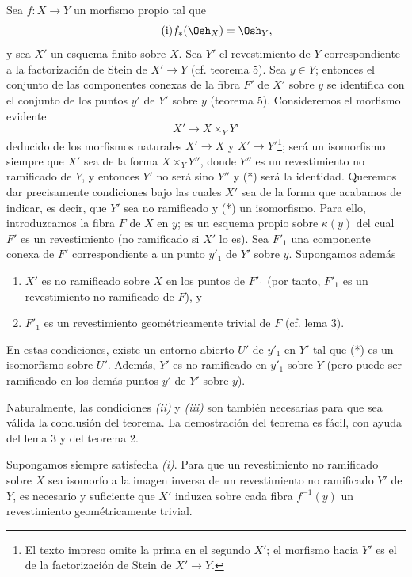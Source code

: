 Sea $f:X\longrightarrow Y$ un morfismo propio tal que
\begin{equation}
  \tag{i}
  f_*(\Osh_X)=\Osh_Y,
\end{equation}
y sea $X'$ un esquema finito sobre $X$. Sea $Y'$ el revestimiento de $Y$
correspondiente a la factorización de Stein de $X'\longrightarrow Y$
(cf. teorema 5). Sea $y\in Y$; entonces el conjunto de las componentes conexas
de la fibra $F'$ de $X'$ sobre $y$ se identifica con el conjunto de los puntos
$y'$ de $Y'$ sobre $y$ (teorema 5). Consideremos el morfismo evidente
\begin{equation}
  \tag{*}
  X'\longrightarrow X\times_Y Y'
\end{equation}
deducido de los morfismos naturales $X'\longrightarrow X$ y
$X'\longrightarrow Y'$\footnote{El texto impreso omite la prima en el segundo
$X'$; el morfismo hacia $Y'$ es el de la factorización de Stein de
$X'\to Y$.}; será un isomorfismo siempre que $X'$ sea de la forma
$X\times_Y Y''$, donde $Y''$ es un revestimiento no ramificado de $Y$, y
entonces $Y'$ no será sino $Y''$ y (*) será la identidad. Queremos dar
precisamente condiciones bajo las cuales $X'$ sea de la forma que acabamos de
indicar, es decir, que $Y'$ sea no ramificado y (*) un isomorfismo. Para ello,
introduzcamos la fibra $F$ de $X$ en $y$; es un esquema propio sobre
$\kappa(y)$ del cual $F'$ es un revestimiento (no ramificado si $X'$ lo es).
Sea $F'_1$ una componente conexa de $F'$ correspondiente a un punto $y'_1$ de
$Y'$ sobre $y$. Supongamos además
\begin{enumerate}
  \item[\textit{(ii)}] $X'$ es no ramificado sobre $X$ en los puntos de $F'_1$
    (por tanto, $F'_1$ es un revestimiento no ramificado de $F$), y
  \item[\textit{(iii)}] $F'_1$ es un revestimiento geométricamente trivial de
    $F$ (cf. lema 3).
\end{enumerate}

 En estas condiciones, existe un entorno abierto $U'$ de
$y'_1$ en $Y'$ tal que (*) es un isomorfismo sobre $U'$. Además, $Y'$ es no
ramificado en $y'_1$ sobre $Y$ (pero puede ser ramificado en los demás puntos
$y'$ de $Y'$ sobre $y$).

Naturalmente, las condiciones \textit{(ii)} y \textit{(iii)} son también
necesarias para que sea válida la conclusión del teorema. La demostración del
teorema es fácil, con ayuda del lema 3 y del teorema 2.

 Supongamos siempre satisfecha \textit{(i)}. Para que un
revestimiento no ramificado sobre $X$ sea isomorfo a la imagen inversa de un
revestimiento no ramificado $Y'$ de $Y$, es necesario y suficiente que $X'$
induzca sobre cada fibra $f^{-1}(y)$ un revestimiento geométricamente trivial.

